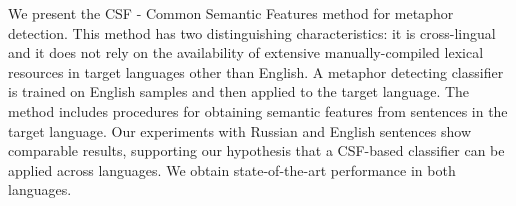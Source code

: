We present the CSF - Common Semantic Features method for metaphor detection. This method has two distinguishing characteristics: it is cross-lingual and it
 does not rely on the availability of extensive manually-compiled lexical
 resources in target languages other than English. A metaphor detecting
 classifier is trained on English samples and then applied to the target
 language. The method includes procedures for obtaining semantic features from
 sentences in the target language. Our experiments with Russian and English
 sentences show comparable results, supporting our hypothesis that a CSF-based
 classifier can be applied across languages. We obtain state-of-the-art
 performance in both languages.

